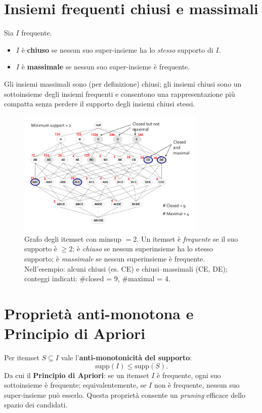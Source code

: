 \section{Insiemi frequenti chiusi e massimali}\label{sec:closed-maximal}
Sia $I$ frequente.
\begin{itemize}
  \item $I$ è \textbf{chiuso} se nessun suo super-insieme ha lo \emph{stesso} supporto di $I$.
  \item $I$ è \textbf{massimale} se nessun suo super-insieme è frequente.
\end{itemize}
Gli insiemi massimali sono (per definizione) chiusi; gli insiemi chiusi sono un sottoinsieme degli insiemi frequenti e consentono una rappresentazione più compatta senza perdere il supporto degli insiemi chiusi stessi.

\begin{figure}[htbp]
  \centering
  \includegraphics[width=0.8\textwidth]{images/insiemi_frequenti_massimale.png}
  \caption[Itemset lattice (minsup 2)]%
  {Grafo degli itemset con minsup $=2$. Un itemset è \emph{frequente} se il suo supporto è \texorpdfstring{$\ge 2$}{>= 2};
  è \emph{chiuso} se nessun superinsieme ha lo stesso supporto; è \emph{massimale} se nessun superinsieme è frequente.
  Nell'esempio: alcuni chiusi (es. CE) e chiusi–massimali (CE, DE); conteggi indicati: \#closed = 9, \#maximal = 4.}
  \label{fig:ifm}
\end{figure}


\section{Proprietà anti-monotona e Principio di Apriori}\label{sec:apriori-principle}
Per itemset $S\subseteq I$ vale l'\textbf{anti-monotonicità del supporto}:
\[
\mathrm{supp}(I)\le \mathrm{supp}(S).\label{eq:anti-mon}
\]
Da cui il \textbf{Principio di Apriori}: se un itemset $I$ è frequente, ogni suo sottoinsieme è frequente; equivalentemente, se $I$ non è frequente, nessun suo super-insieme può esserlo. Questa proprietà consente un \emph{pruning} efficace dello spazio dei candidati.

